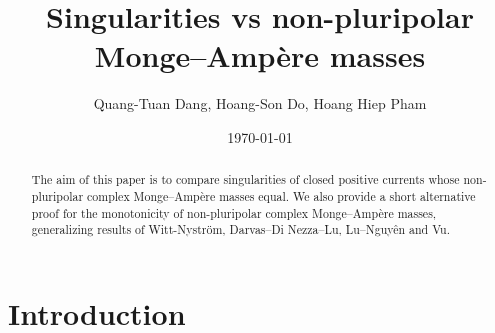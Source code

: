\documentclass[a4paper]{amsart}
\numberwithin{equation}{section}
\theoremstyle{definition}
\numberwithin{equation}{section}
\begin{document}
\title{Singularities vs non-pluripolar Monge--Amp\`{e}re masses}
\author{Quang-Tuan Dang, Hoang-Son Do, Hoang Hiep Pham}


\address{The Abdus Salam International Centre for Theoretical Physics (ICTP), Str. Costiera, 11, 34151 Trieste, TS, Italy}
\address{Vietnam Academy of Science and Technology, Institute of Mathematics, 18 Hoang Quoc Viet Road, Cau Giay, Hanoi, Vietnam}
\date{\today}






\begin{abstract}
 The aim of this paper is to compare singularities of closed positive currents whose non-pluripolar complex Monge--Ampère masses equal. We also provide a short alternative proof for the monotonicity of non-pluripolar complex Monge--Ampère masses, generalizing results of Witt-Nystr\"om, Darvas--Di Nezza--Lu, Lu--Nguy\^en and Vu. 
\end{abstract}

\maketitle
\section{Introduction}
\end{document}
